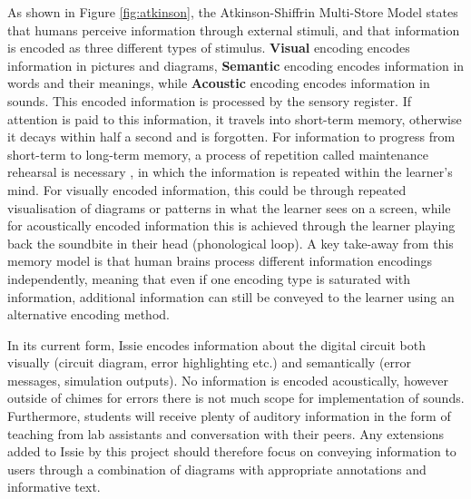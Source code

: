 As shown in Figure \ref{fig:atkinson}, the Atkinson-Shiffrin Multi-Store Model states that humans perceive information through external stimuli, and that information is encoded as three different types of stimulus. \textbf{Visual} encoding encodes information in pictures and diagrams, \textbf{Semantic} encoding encodes information in words and their meanings, while \textbf{Acoustic} encoding encodes information in sounds. This encoded information is processed by the sensory register. If attention is paid to this information, it travels into short-term memory, otherwise it decays within half a second and is forgotten. For information to progress from short-term to long-term memory, a process of repetition called maintenance rehearsal is necessary \cite{multi_store}, in which the information is repeated within the learner's mind. For visually encoded information, this could be through repeated visualisation of diagrams or patterns in what the learner sees on a screen, while for acoustically encoded information this is achieved through the learner playing back the soundbite in their head (phonological loop). A key take-away from this memory model is that human brains process different information encodings independently, meaning that even if one encoding type is saturated with information, additional information can still be conveyed to the learner using an alternative encoding method. 

In its current form, Issie encodes information about the digital circuit both visually (circuit diagram, error highlighting etc.) and semantically (error messages, simulation outputs). No information is encoded acoustically, however outside of chimes for errors there is not much scope for implementation of sounds. Furthermore, students will receive plenty of auditory information in the form of teaching from lab assistants and conversation with their peers. Any extensions added to Issie by this project should therefore focus on conveying information to users through a combination of diagrams with appropriate annotations and informative text.

